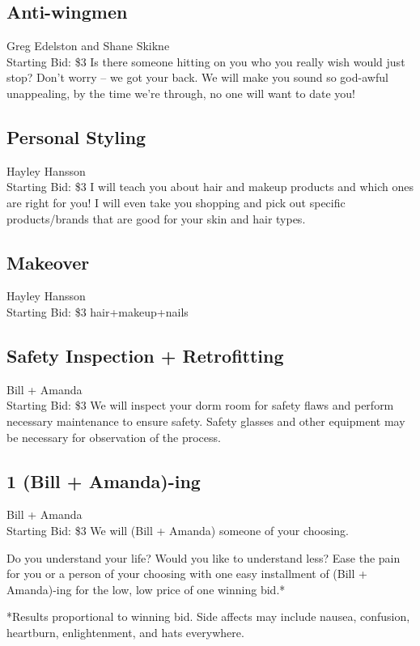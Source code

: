 \documentclass[11pt]{article}
\begin{document}
\subsection{Anti-wingmen}
Greg Edelston and Shane Skikne
\\
Starting Bid: \$3
\newline
Is there someone hitting on you who you really wish would just stop? Don't worry -- we got your back. We will make you sound so god-awful unappealing, by the time we're through, no one will want to date you!
\subsection{Personal Styling }
Hayley Hansson
\\
Starting Bid: \$3
\newline
I will teach you about hair and makeup products and which ones are right for you! I will even take you shopping and pick out specific products/brands that are good for your skin and hair types.
\subsection{Makeover}
Hayley Hansson
\\
Starting Bid: \$3
\newline
hair+makeup+nails
\subsection{Safety Inspection + Retrofitting}
Bill + Amanda
\\
Starting Bid: \$3
\newline
We will inspect your dorm room for safety flaws and perform necessary maintenance to ensure safety. Safety glasses and other equipment may be necessary for observation of the process.
\subsection{1 (Bill + Amanda)-ing}
Bill + Amanda
\\
Starting Bid: \$3
\newline
We will (Bill + Amanda) someone of your choosing.

Do you understand your life? Would you like to understand less? Ease the pain for you or a person of your choosing with one easy installment of (Bill + Amanda)-ing for the low, low price of one winning bid.*

*Results proportional to winning bid. Side affects may include nausea, confusion, heartburn, enlightenment, and hats everywhere.
\end{document}
